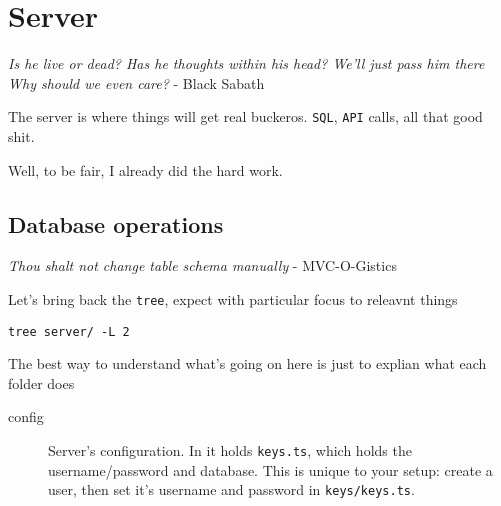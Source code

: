 \documentclass[11pt]{article}
\begin{document}
\section*{Server}
\label{sec:org9304f35}
\begin{center}
\emph{Is he live or dead? Has he thoughts within his head? We'll just pass him there Why should we even care?} - Black Sabath
\end{center}

The server is where things will get real buckeros. \texttt{SQL}, \texttt{API} calls, all that good shit. 

Well, to be fair, I already did the hard work. 

\subsection*{Database operations}
\label{sec:org7779f21}
\begin{center}
\emph{Thou shalt not change table schema manually} - MVC-O-Gistics
\end{center}
Let's bring back the \texttt{tree}, expect with particular focus to releavnt things
\begin{verbatim}
tree server/ -L 2
\end{verbatim}

The best way to understand what's going on here is just to explian what each folder does

\begin{description}
\item[{config}] Server's configuration. In it holds \texttt{keys.ts}, which holds the username/password and database. This is unique to your setup: create a user, then set it's username and password in \texttt{keys/keys.ts}.
\end{description}
\end{document}
